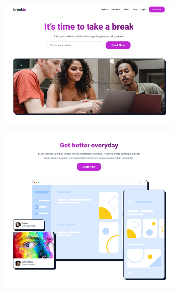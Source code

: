 \documentclass[
  a4paper,
  DIV=11,
  numbers=noendperiod,
  oneside,
  open=any]{scrreprt}
\begin{document}
\begin{figure}

\begin{minipage}{0.33\linewidth}

\begin{figure}[H]

{\centering \includegraphics{images/wniosek1.png}

}


\end{figure}%

\end{minipage}%
%
\begin{minipage}{0.33\linewidth}

\begin{figure}[H]

{\centering \includegraphics{images/wniosek2.png}

}
\end{figure}
\end{minipage}
\end{figure}
\end{document}

